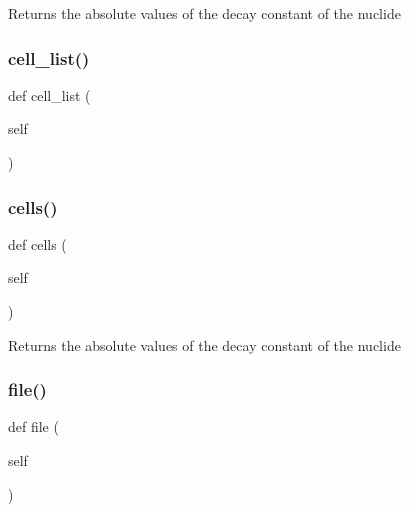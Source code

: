 \begin{DoxyVerb}Returns the absolute values of the decay constant of the nuclide\end{DoxyVerb}
 \mbox{\label{classopenbu_1_1input_1_1_input_a4171f9919b40e53bea460ed36d45e19f}} 
\subsubsection{\texorpdfstring{cell\+\_\+list()}{cell\_list()}}
{\footnotesize\ttfamily def cell\+\_\+list (\begin{DoxyParamCaption}\item[{}]{self }\end{DoxyParamCaption})}

\mbox{\label{classopenbu_1_1input_1_1_input_ada83a03c99c1587bee0ffb75e04f0589}} 
\subsubsection{\texorpdfstring{cells()}{cells()}}
{\footnotesize\ttfamily def cells (\begin{DoxyParamCaption}\item[{}]{self }\end{DoxyParamCaption})}

\begin{DoxyVerb}Returns the absolute values of the decay constant of the nuclide\end{DoxyVerb}
 \mbox{\label{classopenbu_1_1input_1_1_input_a8e0e4d0d014148b7e822d6436d3924d7}} 
\subsubsection{\texorpdfstring{file()}{file()}}
{\footnotesize\ttfamily def file (\begin{DoxyParamCaption}\item[{}]{self }\end{DoxyParamCaption})}


